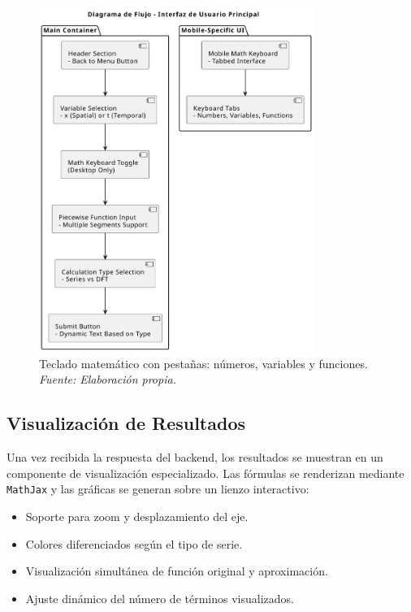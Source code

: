 \begin{figure}[H]
	\centering
	\includegraphics[width=0.8\textwidth]{img/chapter07/mobile.pdf}
	\caption[Interfaz de entrada móvil.]{Teclado matemático con pestañas: números, variables y funciones. \textit{Fuente: Elaboración propia.}}
	\label{fig:frontend-mobile-keyboard}
\end{figure}

\subsection{Visualización de Resultados}

Una vez recibida la respuesta del backend, los resultados se muestran en un componente de visualización especializado. Las fórmulas se renderizan mediante \texttt{MathJax} y las gráficas se generan sobre un lienzo interactivo:

\begin{itemize}
	\item Soporte para zoom y desplazamiento del eje.
	\item Colores diferenciados según el tipo de serie.
	\item Visualización simultánea de función original y aproximación.
	\item Ajuste dinámico del número de términos visualizados.
\end{itemize}

